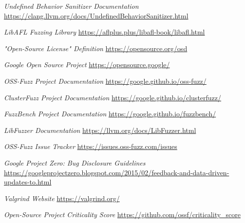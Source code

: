 \documentclass[Lau,oneside]{sapthesis}%
\begin{document}
\begin{thebibliography}{0}
\textit{Undefined Behavior Sanitizer Documentation}
\newline
\url{https://clang.llvm.org/docs/UndefinedBehaviorSanitizer.html}

\textit{LibAFL Fuzzing Library}
\newline
\url{https://aflplus.plus/libafl-book/libafl.html}

\textit{"Open-Source License" Definition}
\newline
\url{https://opensource.org/osd}

\textit{Google Open Source Project}
\newline
\url{https://opensource.google/}

\textit{OSS-Fuzz Project Documentation}
\newline
\url{https://google.github.io/oss-fuzz/}

\textit{ClusterFuzz Project Documentation}
\newline
\url{https://google.github.io/clusterfuzz/}

\textit{FuzzBench Project Documentation}
\newline
\url{https://google.github.io/fuzzbench/}

\textit{LibFuzzer Documentation}
\newline
\url{https://llvm.org/docs/LibFuzzer.html}

\textit{OSS-Fuzz Issue Tracker}
\newline
\url{https://issues.oss-fuzz.com/issues}

\textit{Google Project Zero: Bug Disclosure Guidelines}
\newline
\url{https://googleprojectzero.blogspot.com/2015/02/feedback-and-data-driven-updates-to.html}

\textit{Valgrind Website}
\newline
\url{https://valgrind.org/}

\textit{Open-Source Project Criticality Score}
\newline
\url{https://github.com/ossf/criticality_score}

\end{thebibliography}
\end{document}
